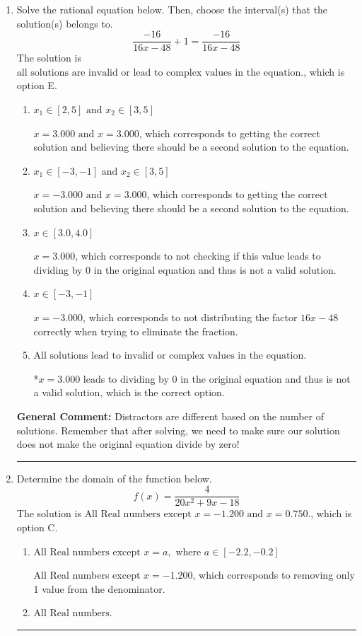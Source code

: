 \documentclass{extbook}[14pt]
\newcommand{\litem}[1]{\item #1

\rule{\textwidth}{0.4pt}}
\begin{document}
\begin{enumerate}\litem{
Solve the rational equation below. Then, choose the interval(s) that the solution(s) belongs to.
\[ \frac{-16}{16x -48} + 1 = \frac{-16}{16x -48} \]The solution is \( \text{all solutions are invalid or lead to complex values in the equation.} \), which is option E.\begin{enumerate}[label=\Alph*.]
\item \( x_1 \in [2, 5] \text{ and } x_2 \in [3,5] \)

$x = 3.000 \text{ and } x = 3.000$, which corresponds to getting the correct solution and believing there should be a second solution to the equation.
\item \( x_1 \in [-3, -1] \text{ and } x_2 \in [3,5] \)

$x = -3.000 \text{ and } x = 3.000$, which corresponds to getting the correct solution and believing there should be a second solution to the equation.
\item \( x \in [3.0,4.0] \)

$x = 3.000$, which corresponds to not checking if this value leads to dividing by 0 in the original equation and thus is not a valid solution.
\item \( x \in [-3,-1] \)

$x = -3.000$, which corresponds to not distributing the factor $16x -48$ correctly when trying to eliminate the fraction.
\item \( \text{All solutions lead to invalid or complex values in the equation.} \)

*$x = 3.000$ leads to dividing by 0 in the original equation and thus is not a valid solution, which is the correct option.
\end{enumerate}

\textbf{General Comment:} Distractors are different based on the number of solutions. Remember that after solving, we need to make sure our solution does not make the original equation divide by zero!
}
\litem{
Determine the domain of the function below.
\[ f(x) = \frac{4}{20x^{2} +9 x -18} \]The solution is \( \text{All Real numbers except } x = -1.200 \text{ and } x = 0.750. \), which is option C.\begin{enumerate}[label=\Alph*.]
\item \( \text{All Real numbers except } x = a, \text{ where } a \in [-2.2, -0.2] \)

All Real numbers except $x = -1.200$, which corresponds to removing only 1 value from the denominator.
\item \( \text{All Real numbers.} \)


\end{enumerate}}
\end{enumerate}
\end{document}

